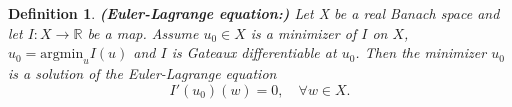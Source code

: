 \documentclass[12pt,openany]{book}
\newcommand{\R}{\mathbb{R}}
\theoremstyle{plainnormal}
\newtheorem{definition}[theorem]{Definition}
\theoremstyle{remark}
\begin{document}
\begin{definition}\label{EL_eq}\textbf{(Euler-Lagrange equation:)}
Let X be a real Banach space and let \mbox{$I: X\rightarrow\R$} be a map. Assume $u_0\in X$ is a minimizer of $I$ on $X$, $u_0 = \mathrm{argmin}_u I(u)$ and $I$ is Gateaux differentiable at $u_0$. Then the minimizer $u_0$ is a solution of the \emph{Euler-Lagrange equation} $$I'(u_0)(w) = 0, \quad \forall w \in X.$$
\end{definition}
\end{document}
